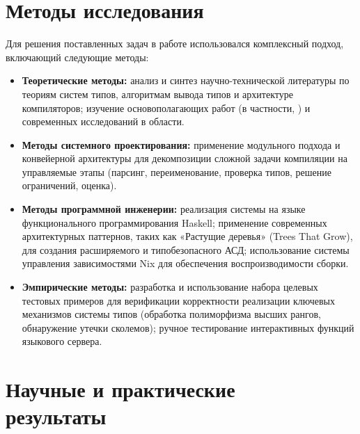 \chapter{Методы исследования}
Для решения поставленных задач в работе использовался комплексный подход, включающий следующие методы:
\begin{itemize}
    \item \textbf{Теоретические методы:} анализ и синтез научно-технической литературы по теориям систем типов, алгоритмам вывода типов и архитектуре компиляторов; изучение основополагающих работ (в частности, \cite{jones-practical-2007}) и современных исследований в области.
    \item \textbf{Методы системного проектирования:} применение модульного подхода и конвейерной архитектуры для декомпозиции сложной задачи компиляции на управляемые этапы (парсинг, переименование, проверка типов, решение ограничений, оценка).
    \item \textbf{Методы программной инженерии:} реализация системы на языке функционального программирования Haskell; применение современных архитектурных паттернов, таких как «Растущие деревья» (Trees That Grow), для создания расширяемого и типобезопасного АСД; использование системы управления зависимостями Nix для обеспечения воспроизводимости сборки.
    \item \textbf{Эмпирические методы:} разработка и использование набора целевых тестовых примеров для верификации корректности реализации ключевых механизмов системы типов (обработка полиморфизма высших рангов, обнаружение утечки сколемов); ручное тестирование интерактивных функций языкового сервера.
\end{itemize}

\chapter[Научные и практические результаты]{Научные и практические \\ результаты}

